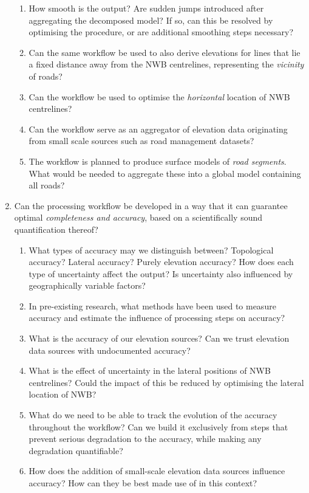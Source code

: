 \begin{enumerate}
\begin{enumerate}
        \item How smooth is the output? Are sudden jumps introduced after aggregating the decomposed model? If so, can this be resolved by optimising the procedure, or are additional smoothing steps necessary?
        \item Can the same workflow be used to also derive elevations for lines that lie a fixed distance away from the NWB centrelines, representing the \textit{vicinity} of roads?
        \item Can the workflow be used to optimise the \textit{horizontal} location of NWB centrelines?
        \item Can the workflow serve as an aggregator of elevation data originating from small scale sources such as road management datasets?
        \item The workflow is planned to produce surface models of \textit{road segments}. What would be needed to aggregate these into a global model containing all roads?
    \end{enumerate}
    \item Can the processing workflow be developed in a way that it can guarantee optimal \textit{completeness and accuracy}, based on a scientifically sound quantification thereof?
    \begin{enumerate}
        \item What types of accuracy may we distinguish between? Topological accuracy? Lateral accuracy? Purely elevation accuracy? How does each type of uncertainty affect the output? Is uncertainty also influenced by geographically variable factors?
        \item In pre-existing research, what methods have been used to measure accuracy and estimate the influence of processing steps on accuracy?
        \item What is the accuracy of our elevation sources? Can we trust elevation data sources with undocumented accuracy?
        \item What is the effect of uncertainty in the lateral positions of NWB centrelines? Could the impact of this be reduced by optimising the lateral location of NWB?
        \item What do we need to be able to track the evolution of the accuracy throughout the workflow? Can we build it exclusively from steps that prevent serious degradation to the accuracy, while making any degradation quantifiable?
        \item How does the addition of small-scale elevation data sources influence accuracy? How can they be best made use of in this context?

\end{enumerate}
\end{enumerate}
